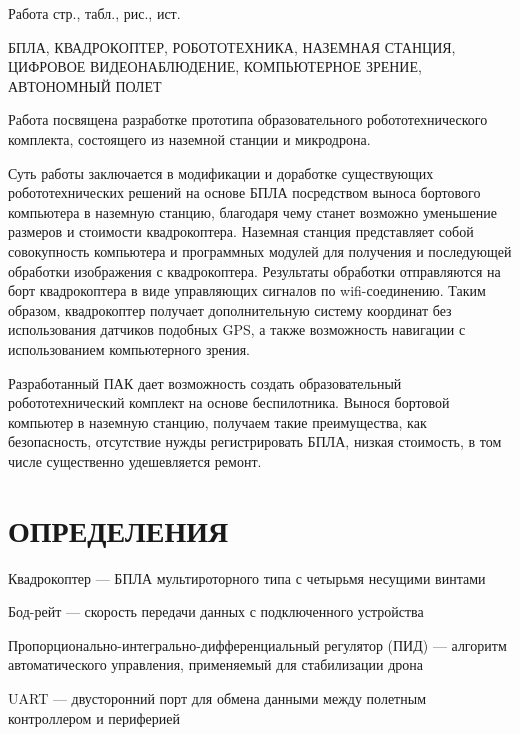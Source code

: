 \documentclass[a4paper,12pt]{article}
\begin{document}
\thispagestyle{empty} %

Работа  стр.,  табл.,  рис., \totalmycitecounts ист. 

БПЛА, КВАДРОКОПТЕР, РОБОТОТЕХНИКА, НАЗЕМНАЯ СТАНЦИЯ, ЦИФРОВОЕ ВИДЕОНАБЛЮДЕНИЕ, КОМПЬЮТЕРНОЕ ЗРЕНИЕ, АВТОНОМНЫЙ ПОЛЕТ

Работа посвящена разработке прототипа образовательного робототехнического комплекта, состоящего из наземной станции и микродрона.

Суть работы заключается в модификации и доработке существующих робототехнических решений на основе БПЛА посредством выноса бортового компьютера в наземную станцию, благодаря чему станет возможно уменьшение размеров и стоимости квадрокоптера.
Наземная станция представляет собой совокупность компьютера и программных модулей для получения и последующей обработки изображения с квадрокоптера. Результаты обработки отправляются на борт квадрокоптера в виде управляющих сигналов по wifi-соединению.
Таким образом, квадрокоптер получает дополнительную систему координат без использования датчиков подобных GPS, а также возможность навигации с использованием компьютерного зрения.

Разработанный ПАК дает возможность создать образовательный робототехнический комплект на основе беспилотника. Вынося бортовой компьютер в наземную станцию, получаем такие преимущества, как безопасность, отсутствие нужды регистрировать БПЛА, низкая стоимость, в том числе существенно удешевляется ремонт.

\pagebreak
\thispagestyle{empty}

\section*{\centering ОПРЕДЕЛЕНИЯ}

\thispagestyle{empty} %

Квадрокоптер --- БПЛА мультироторного типа с четырьмя несущими винтами

Бод-рейт --- скорость передачи данных с подключенного устройства

Пропорционально-интегрально-дифференциальный регулятор (ПИД) --- алгоритм автоматического управления, применяемый для стабилизации дрона

UART --- двусторонний порт для обмена данными между полетным контроллером и периферией

\pagebreak
\thispagestyle{empty}
\end{document}
